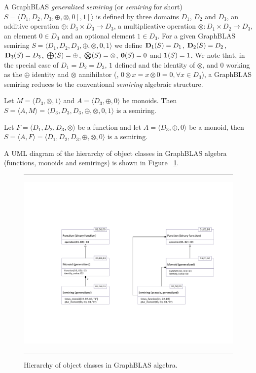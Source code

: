 \documentclass[11pt]{extarticle}
\begin{document}
A GraphBLAS \emph{generalized semiring} (or \emph{semiring} for short)
$S=\langle D_1,D_2,D_3,\oplus,\otimes,0 [,1] \rangle$ is defined by
three domains $D_1$, $D_2$ and $D_3$, an additive operation $\oplus :
D_3 \times D_3 \rightarrow D_3$, 
a multiplicative operation $\otimes : D_1 \times D_2 \rightarrow
D_3$, an element $0 \in D_3$ and an optional element $1 \in D_3$.
For a given GraphBLAS semiring $S=\langle D_1,
D_2, D_3,\oplus,\otimes,0,1 \rangle$ we define $\bold{D}_1(S) = D_1$,
$\bold{D}_2(S) = D_2$, $\bold{D}_3(S) = D_3$, $\bold{\bigoplus}(S) =
\oplus$, $\bold{\bigotimes}(S) = \otimes$, ${\bf 0}(S) = 0$ and ${\bf 1}(S) =
1$. We note that, in the special case of $D_1 = D_2 = D_3$, $1$ defined and the identity of $\otimes$,
and $0$ working as the $\oplus$ identity and $\otimes$ annihilator (\ie, $0 \otimes x = x
\otimes 0 = 0, \forall x \in D_3$), a GraphBLAS semiring reduces to the
conventional \emph{semiring} algebraic structure.

Let $M = \langle D_3, \otimes,1 \rangle$ and $A = \langle D_3,\oplus,0 \rangle$ be monoids.
Then $S= \langle A,M \rangle = \langle D_3,D_3,D_3,\oplus,\otimes,0,1 \rangle$
is a semiring.

Let $F = \langle D_1,D_2,D_3,\otimes \rangle$ be a function
and let $A = \langle D_3,\oplus,0 \rangle$ be a monoid,
then $S= \langle A,F \rangle = \langle D_1,D_2,D_3,\oplus,\otimes,0 \rangle$
is a semiring.

A UML diagram of the hierarchy of object classes in GraphBLAS
algebra (functions, monoids and semirings) is shown in 
Figure ~\ref{Fig:AlgebraHierarchyProposed}.

\begin{figure}[htb]
\hrule
\begin{center}
\includegraphics[width=1.0\linewidth,trim=0in 2in 0in 2in]{Algebra_Hierarchy_proposed.pdf}
\end{center}
\caption{Hierarchy of object classes in GraphBLAS algebra.}
\label{Fig:AlgebraHierarchyProposed}
\hrule
\end{figure}

\def\IEEEbibitemsep{3pt plus .5pt}


\end{document}
